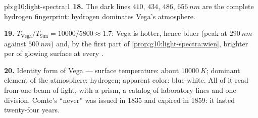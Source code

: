 \begin{solution}{pb:g10:light-spectra:1}
\textbf{18.} The dark lines $410$, $434$, $486$, $\qty{656}{nm}$ are the
complete hydrogen fingerprint: hydrogen dominates Vega's atmosphere.

\textbf{19.} $T_{\text{Vega}} / T_{\text{Sun}} = 10000 / 5800 \approx
1.7$: Vega is hotter, hence bluer (peak at $\qty{290}{nm}$ against
$\qty{500}{nm}$) and, by the first part of
\cref{prop:g10:light-spectra:wien}, brighter per  of glowing surface
at every .

\textbf{20.} Identity form of Vega --- surface temperature: about
$\qty{10000}{K}$; dominant element of the atmosphere: hydrogen; apparent
color: blue-white. All of it read from one beam of light, with a prism, a
catalog of laboratory lines and one division. Comte's ``never'' was
issued in 1835 and expired in 1859: it lasted twenty-four years.
\end{solution}
